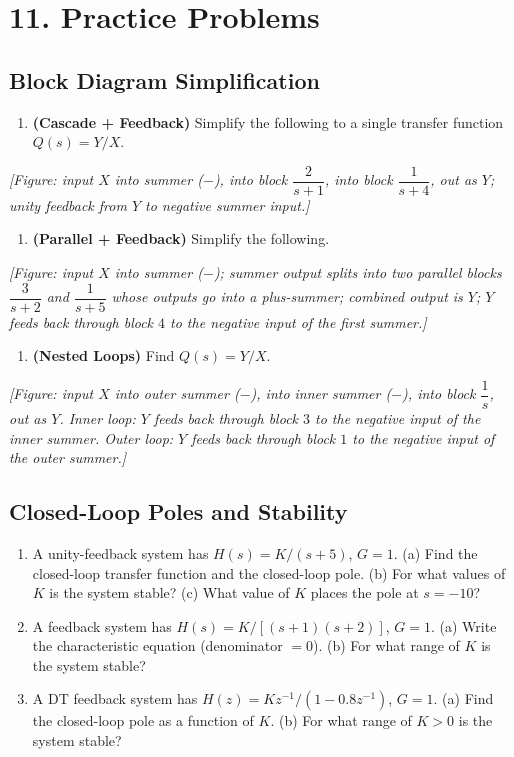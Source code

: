 \documentclass[11pt]{article}
\begin{document}
\section*{11. Practice Problems}

\subsection*{Block Diagram Simplification}

\begin{enumerate}
  \item \textbf{(Cascade + Feedback)} Simplify the following to a single transfer function $Q(s) = Y/X$.
\end{enumerate}

   \textit{[Figure: input $X$ into summer ($-$), into block $\dfrac{2}{s+1}$, into block $\dfrac{1}{s+4}$, out as $Y$; unity feedback from $Y$ to negative summer input.]}

\begin{enumerate}
  \item \textbf{(Parallel + Feedback)} Simplify the following.
\end{enumerate}

   \textit{[Figure: input $X$ into summer ($-$); summer output splits into two parallel blocks $\dfrac{3}{s+2}$ and $\dfrac{1}{s+5}$ whose outputs go into a plus-summer; combined output is $Y$; $Y$ feeds back through block $4$ to the negative input of the first summer.]}

\begin{enumerate}
  \item \textbf{(Nested Loops)} Find $Q(s) = Y/X$.
\end{enumerate}

   \textit{[Figure: input $X$ into outer summer ($-$), into inner summer ($-$), into block $\dfrac{1}{s}$, out as $Y$. Inner loop: $Y$ feeds back through block $3$ to the negative input of the inner summer. Outer loop: $Y$ feeds back through block $1$ to the negative input of the outer summer.]}

\subsection*{Closed-Loop Poles and Stability}

\begin{enumerate}
  \item A unity-feedback system has $H(s) = K/(s+5)$, $G = 1$. (a) Find the closed-loop transfer function and the closed-loop pole. (b) For what values of $K$ is the system stable? (c) What value of $K$ places the pole at $s = -10$?
  \item A feedback system has $H(s) = K/[(s+1)(s+2)]$, $G = 1$. (a) Write the characteristic equation (denominator $= 0$). (b) For what range of $K$ is the system stable?
  \item A DT feedback system has $H(z) = Kz^{-1}/(1 - 0.8z^{-1})$, $G = 1$. (a) Find the closed-loop pole as a function of $K$. (b) For what range of $K > 0$ is the system stable?
\end{enumerate}
\end{document}
